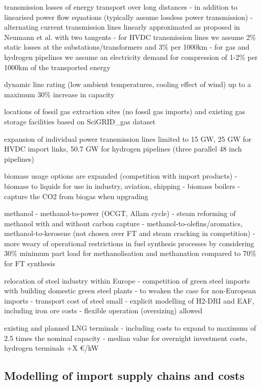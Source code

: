 transmission losses of energy transport over long distances
- in addition to linearised power flow equations (typically assume lossless power transmission)
- alternating current transmission lines linearly approximated as proposed in Neumann et al.\cite{neumannAssessmentsLinear2022} with two tangents
- for HVDC transmission lines we assume 2\% static losses at the substations/transformers and 3\% per 1000km
- for gas and hydrogen pipelines we assume an electricity demand for compression of 1-2\% per 1000km of the transported energy \cite{gasforclimateEuropeanHydrogen2021}

dynamic line rating \cite{glaumLeveragingExisting2023} (low ambient temperatures, cooling effect of wind) up to a maximum 30\% increase in capacity

locations of fossil gas extraction sites (no fossil gas imports) and existing gas storage facilities based on SciGRID\_gas\cite{plutaSciGRIDGas2022a} dataset

expansion of individual power transmission lines limited to 15 GW, 25 GW for HVDC import links, 50.7 GW for hydrogen pipelines (three parallel 48 inch pipelines)

biomass usage options are expanded (competition with import products)
- biomass to liquids for use in industry, aviation, shipping
- biomass boilers
- capture the CO2 from biogas when upgrading

methanol
- methanol-to-power (OCGT, Allam cycle) \cite{brownUltralongdurationEnergy2023}
- steam reforming of methanol with and without carbon capture
- methanol-to-olefins/aromatics, methanol-to-kerosene (not chosen over FT and steam cracking in competition)
- more weary of operational restrictions in fuel synthesis processes by considering 30\% minimum part load for methanolisation and methanation compared to 70\% for FT synthesis

relocation of steel industry within Europe
- competition of green steel imports with building domestic green steel plants
- to weaken the case for non-European imports
- transport cost of steel small
- explicit modelling of H2-DRI and EAF, including iron ore costs
- flexible operation (oversizing) allowed

existing and planned LNG terminals \cite{globalenergymonitor}
- including costs to expand to maximum of 2.5 times the nominal capacity
- median value for overnight investment costs, hydrogen terminals +X €/kW

\subsection*{Modelling of import supply chains and costs}

